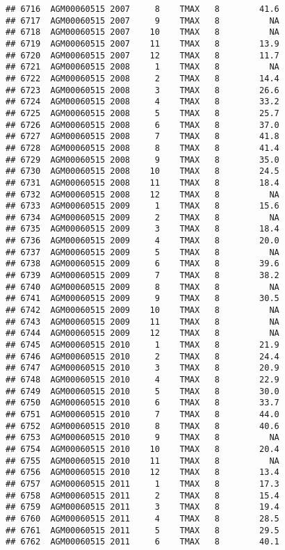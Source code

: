 \documentclass{article}\usepackage[]{graphicx}\usepackage[]{color}
\makeatletter
\newenvironment{kframe}{%
 \def\at@end@of@kframe{}%
 \ifinner\ifhmode%
  \def\at@end@of@kframe{\end{minipage}}%
  \begin{minipage}{\columnwidth}%
 \fi\fi%
 \def\FrameCommand##1{\hskip\@totalleftmargin \hskip-\fboxsep
 \colorbox{shadecolor}{##1}\hskip-\fboxsep
     \hskip-\linewidth \hskip-\@totalleftmargin \hskip\columnwidth}%
 \MakeFramed {\advance\hsize-\width
   \@totalleftmargin\z@ \linewidth\hsize
   \@setminipage}}%
 {\par\unskip\endMakeFramed%
 \at@end@of@kframe}
\newenvironment{knitrout}{}{} %
\makeatother
\begin{document}
\begin{knitrout}
\begin{kframe}
\begin{verbatim}
## 6716  AGM00060515 2007     8    TMAX   8        41.6
## 6717  AGM00060515 2007     9    TMAX   8          NA
## 6718  AGM00060515 2007    10    TMAX   8          NA
## 6719  AGM00060515 2007    11    TMAX   8        13.9
## 6720  AGM00060515 2007    12    TMAX   8        11.7
## 6721  AGM00060515 2008     1    TMAX   8          NA
## 6722  AGM00060515 2008     2    TMAX   8        14.4
## 6723  AGM00060515 2008     3    TMAX   8        26.6
## 6724  AGM00060515 2008     4    TMAX   8        33.2
## 6725  AGM00060515 2008     5    TMAX   8        25.7
## 6726  AGM00060515 2008     6    TMAX   8        37.0
## 6727  AGM00060515 2008     7    TMAX   8        41.8
## 6728  AGM00060515 2008     8    TMAX   8        41.4
## 6729  AGM00060515 2008     9    TMAX   8        35.0
## 6730  AGM00060515 2008    10    TMAX   8        24.5
## 6731  AGM00060515 2008    11    TMAX   8        18.4
## 6732  AGM00060515 2008    12    TMAX   8          NA
## 6733  AGM00060515 2009     1    TMAX   8        15.6
## 6734  AGM00060515 2009     2    TMAX   8          NA
## 6735  AGM00060515 2009     3    TMAX   8        18.4
## 6736  AGM00060515 2009     4    TMAX   8        20.0
## 6737  AGM00060515 2009     5    TMAX   8          NA
## 6738  AGM00060515 2009     6    TMAX   8        39.6
## 6739  AGM00060515 2009     7    TMAX   8        38.2
## 6740  AGM00060515 2009     8    TMAX   8          NA
## 6741  AGM00060515 2009     9    TMAX   8        30.5
## 6742  AGM00060515 2009    10    TMAX   8          NA
## 6743  AGM00060515 2009    11    TMAX   8          NA
## 6744  AGM00060515 2009    12    TMAX   8          NA
## 6745  AGM00060515 2010     1    TMAX   8        21.9
## 6746  AGM00060515 2010     2    TMAX   8        24.4
## 6747  AGM00060515 2010     3    TMAX   8        20.9
## 6748  AGM00060515 2010     4    TMAX   8        22.9
## 6749  AGM00060515 2010     5    TMAX   8        30.0
## 6750  AGM00060515 2010     6    TMAX   8        33.7
## 6751  AGM00060515 2010     7    TMAX   8        44.0
## 6752  AGM00060515 2010     8    TMAX   8        40.6
## 6753  AGM00060515 2010     9    TMAX   8          NA
## 6754  AGM00060515 2010    10    TMAX   8        20.4
## 6755  AGM00060515 2010    11    TMAX   8          NA
## 6756  AGM00060515 2010    12    TMAX   8        13.4
## 6757  AGM00060515 2011     1    TMAX   8        17.3
## 6758  AGM00060515 2011     2    TMAX   8        15.4
## 6759  AGM00060515 2011     3    TMAX   8        19.4
## 6760  AGM00060515 2011     4    TMAX   8        28.5
## 6761  AGM00060515 2011     5    TMAX   8        29.5
## 6762  AGM00060515 2011     6    TMAX   8        40.1

\end{verbatim}
\end{kframe}
\end{knitrout}
\end{document}
